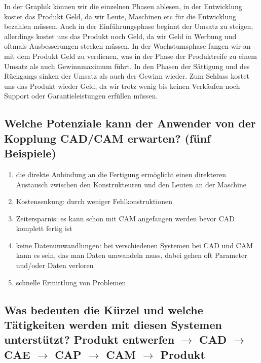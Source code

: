 In der Graphik können wir die einzelnen Phasen ablesen, in der Entwicklung
kostet das Produkt Geld, da wir Leute, Maschinen etc für die Entwicklung
bezahlen müssen. Auch in der Einführungsphase beginnt der Umsatz zu steigen,
allerdings kostet uns das Produkt noch Geld, da wir Geld in Werbung und oftmals
Ausbesserungen stecken müssen. In der Wachstumsphase fangen wir an mit dem
Produkt Geld zu verdienen, was in der Phase der Produktreife zu einem Umsatz
als auch Gewinnmaximum führt. In den Phasen der Sättigung und des Rückgangs
sinken der Umsatz als auch der Gewinn wieder. Zum Schluss kostet uns das
Produkt wieder Geld, da wir trotz wenig bis keinen Verkäufen noch Support oder
Garantieleistungen erfüllen müssen.

\subsection*{%
    Welche Potenziale kann der Anwender von der Kopplung CAD/CAM erwarten?
    (fünf Beispiele)
}

\begin{enumerate}[1)]
    \item
        die direkte Anbindung an die Fertigung ermöglicht einen direkteren
        Austausch zwischen den Konstrukteuren und den Leuten an der Maschine
    \item
        Kostensenkung: durch weniger Fehlkonstruktionen
    \item
        Zeitersparnis: es kann schon mit CAM angefangen werden bevor CAD
        komplett fertig ist
    \item
        keine Datenumwandlungen: bei verschiedenen Systemen bei CAD und CAM
        kann es sein, das man Daten umwandeln muss, dabei gehen oft Parameter
        und/oder Daten verloren
    \item
        schnelle Ermittlung von Problemen
\end{enumerate}

\newpage

\subsection*{%
    Was bedeuten die Kürzel und welche Tätigkeiten werden mit diesen Systemen
    unterstützt?  Produkt entwerfen $\rightarrow$ CAD $\rightarrow$ CAE
    $\rightarrow$ CAP $\rightarrow$ CAM $\rightarrow$ Produkt
}

